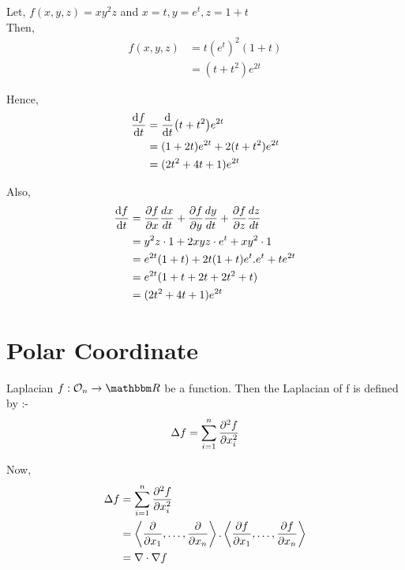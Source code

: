 \documentclass[Analysis-3]{subfiles}
\begin{document}
\begin{Eg}{}{}
	Let, $f(x,y,z) = xy^{2}z$ and $x=t, y=e^t, z= 1+t$ \\
	Then, \begin{align*}
		f(x,y,z) & = t(e^t)^2(1+t) \\
		         & = (t+t^2)e^{2t}
	\end{align*}

	Hence, \begin{align*}
		\dv{f}{t} & = \dv{t}(t+t^2)e^{2t}           \\
		          & = (1+2t)e^{2t} + 2(t+t^2)e^{2t} \\
		          & = (2t^2+4t+1)e^{2t}
	\end{align*}

	Also, \begin{align*}
		\dv{f}{t} & = \pdv{f}{x} \frac{dx}{dt} + \pdv{f}{y} \frac{dy}{dt} + \pdv{f}{z} \frac{dz}{dt} \\
		          & = y^2z\cdot 1 + 2xyz\cdot e^t + xy^2\cdot 1                                      \\
		          & = e^{2t}(1+t) + 2t(1+t)e^t.e^t + te^{2t}                                         \\
		          & = e^{2t}(1+t+2t+2t^2+t)                                                          \\
		          & = (2t^2+4t+1)e^{2t}
	\end{align*}
\end{Eg}


\section{Polar Coordinate}

\begin{Def}{Laplacian}{}
	$f : \Op{n} \to \R$ be a function. Then the Laplacian of f is defined by :- \[ \Delta f = \sum_{i = 1}^{n} \pdv[2]{f}{x_i}   \]
\end{Def}

Now, \begin{align*}
	\Delta f & = \sum_{i=1}^{n} \pdv[2]{f}{x_i}                                                                                               \\
	         & = \left\langle \pdv{}{x_1}, \ldots, \pdv{}{x_n}  \right\rangle. \left\langle \pdv{f}{x_1}, \ldots, \pdv{f}{x_n}  \right\rangle \\
	         & = \nabla\cdot\nabla f
\end{align*}
\end{document}
